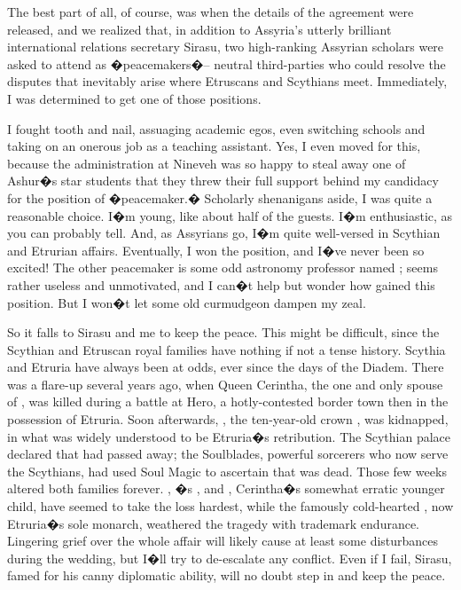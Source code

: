 \documentclass[char]{Kos}
\begin{document}
The best part of all, of course, was when the details of the agreement were released, and we realized that, in addition to Assyria's utterly brilliant international relations secretary Sirasu, two high-ranking Assyrian scholars were asked to attend as �peacemakers�-- neutral third-parties who could resolve the disputes that inevitably arise where Etruscans and Scythians meet. Immediately, I was determined to get one of those positions.

I fought tooth and nail, assuaging academic egos, even switching schools and taking on an onerous job as a teaching assistant. Yes, I even moved for this, because the administration at Nineveh was so happy to steal away one of Ashur�s star students that they threw their full support behind my candidacy for the position of �peacemaker.� Scholarly shenanigans aside, I was quite a reasonable choice. I�m young, like about half of the guests. I�m enthusiastic, as you can probably tell. And, as Assyrians go, I�m quite well-versed in Scythian and Etrurian affairs. Eventually, I won the position, and I�ve never been so excited! The other peacemaker is some odd astronomy professor named \cAnarchist{}; \cAnarchist{\they} seems rather useless and unmotivated, and I can�t help but wonder how \cAnarchist{\they} gained this position. But I won�t let some old curmudgeon dampen my zeal.

So it falls to Sirasu and me to keep the peace. This might be difficult, since the Scythian and Etruscan royal families have nothing if not a tense history. Scythia and Etruria have always been at odds, ever since the days of the Diadem. There was a flare-up several years ago, when Queen Cerintha, the one and only spouse of \cEtruriaKing{}, was killed during a battle at Hero, a hotly-contested border town then in the possession of Etruria. Soon afterwards, \cFugitive{}, the ten-year-old crown \cFugitive{\prince}, was kidnapped, in what was widely understood to be Etruria�s retribution. The Scythian palace declared that \cFugitive{\nickname} had passed away; the Soulblades, powerful sorcerers who now serve the Scythians, had used Soul Magic to ascertain that \cFugitive{\they} was dead. Those few weeks altered both families forever. \cScythiaQueen{\nickname}, \cFugitive{}�s \cScythiaQueen{\parent}, and \cPoet{\nickname}, Cerintha�s somewhat erratic younger child, have seemed to take the loss hardest, while the famously cold-hearted \cEtruriaKing{}, now Etruria�s sole monarch, weathered the tragedy with \cEtruriaKing{\their} trademark endurance. Lingering grief over the whole affair will likely cause at least some disturbances during the wedding, but I�ll try to de-escalate any conflict. Even if I fail, Sirasu, famed for his canny diplomatic ability, will no doubt step in and keep the peace.
\end{document}
